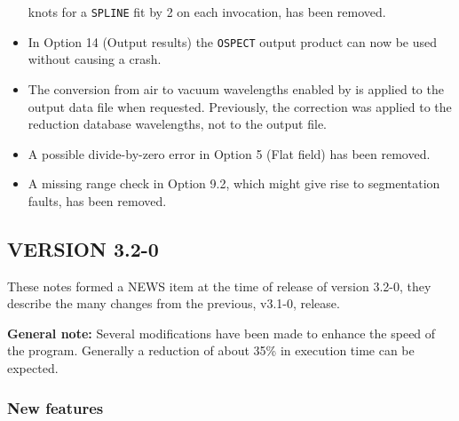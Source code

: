 \documentclass[twoside,11pt,nolof]{starlink}
\begin{document}
\begin{itemize}
   knots for a \texttt{SPLINE} fit by 2 on each invocation, has been removed.
\item In Option 14 (Output results) the \texttt{OSPECT} output product can now
   be used without causing a crash.
\item The conversion from air to vacuum wavelengths enabled by
    is applied to
   the output data file when requested.
   Previously, the correction was applied to the reduction database
   wavelengths, not to the output file.
\item A possible divide-by-zero error in Option 5 (Flat field) has been
   removed.
\item A missing range check in Option 9.2, which might give rise to
   segmentation faults, has been removed.
\end{itemize}

\subsection{VERSION 3.2-0}

These notes formed a NEWS item at the time of release of version 3.2-0, they
describe the many changes from the previous, v3.1-0, release.

{\bf General note:}
 Several modifications have been made to enhance the speed of the
 program.  Generally a reduction of about 35\% in execution time can
 be expected.

\subsubsection{New features}
\end{document}
